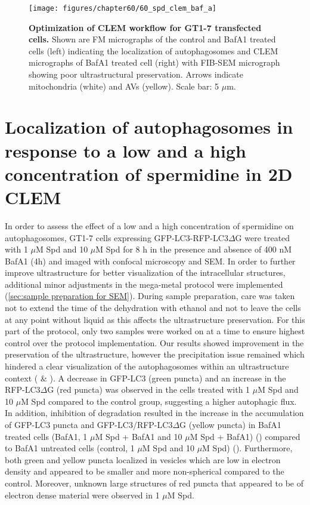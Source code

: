 \begin{landscape}
\begin{figure}[!htbp]
\center
 \texttt{[image: figures/chapter60/60\_spd\_clem\_baf\_a]}
 \caption[Optimization of CLEM workflow for GT1-7 transfected cells]{\textbf{Optimization of CLEM workflow for GT1-7 transfected cells.} Shown are FM micrographs of the control and BafA1 treated cells (left) indicating the localization of autophagosomes and CLEM micrographs of BafA1 treated cell (right) with FIB-SEM micrograph showing poor ultrastructural preservation. Arrows indicate mitochondria (white) and AVs (yellow). Scale bar: 5 $\mu$m.}
 \label{fig:60_spd_clem_baf_a}
\end{figure} 
\end{landscape}

\section{Localization of autophagosomes in response to a low and a high concentration of spermidine in 2D CLEM}\label{sec:localization_autophagosomes_low_high_spermidine_2DCLEM}
In order to assess the effect of a low and a high concentration of spermidine on autophagosomes, GT1-7 cells expressing GFP-LC3-RFP-LC3$\Delta$G were treated with 1 $\mu$M Spd and 10 $\mu$M Spd for 8 h in the presence and absence of 400 nM BafA1 (4h) and imaged with confocal microscopy and SEM. In order to further improve ultrastructure for better visualization of the intracellular structures, additional minor adjustments in the mega-metal protocol were implemented (\cref{sec:sample preparation for SEM}). During sample preparation, care was taken not to extend the time of the dehydration with ethanol and not to leave the cells at any point without liquid as this affects the ultrastructure preservation. For this part of the protocol, only two samples were worked on at a time to ensure highest control over the protocol implementation. Our results showed improvement in the preservation of the ultrastructure, however the precipitation issue remained which hindered a clear visualization of the autophagosomes within an ultrastructure context ( \& ). A decrease in GFP-LC3 (green puncta) and an increase in the RFP-LC3$\Delta$G (red puncta) was observed in the cells treated with 1 $\mu$M Spd and 10 $\mu$M Spd compared to the control group, suggesting a higher autophagic flux. In addition, inhibition of degradation resulted in the increase in the accumulation of GFP-LC3 puncta and GFP-LC3/RFP-LC3$\Delta$G (yellow puncta) in BafA1 treated cells (BafA1, 1 $\mu$M Spd + BafA1 and 10 $\mu$M Spd + BafA1) () compared to BafA1 untreated cells (control, 1 $\mu$M Spd and 10 $\mu$M Spd) (). Furthermore, both green and yellow puncta localized in vesicles which are low in electron density and appeared to be smaller and more non-spherical compared to the control. Moreover, unknown large structures of red puncta that appeared to be of electron dense material were observed in 1 $\mu$M Spd. 

